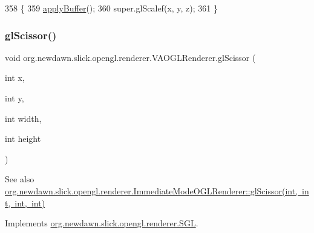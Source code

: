\begin{DoxyCode}
358                                                     \{
359         \mbox{\hyperlink{classorg_1_1newdawn_1_1slick_1_1opengl_1_1renderer_1_1_v_a_o_g_l_renderer_a7c5d09419cd40761be8f849631aebab5}{applyBuffer}}();
360         super.glScalef(x, y, z);
361     \}
\end{DoxyCode}
\mbox{\label{classorg_1_1newdawn_1_1slick_1_1opengl_1_1renderer_1_1_v_a_o_g_l_renderer_a496a073a0a3dea08b3fbace7673d6b29}} 
\subsubsection{\texorpdfstring{gl\+Scissor()}{glScissor()}}
{\footnotesize\ttfamily void org.\+newdawn.\+slick.\+opengl.\+renderer.\+V\+A\+O\+G\+L\+Renderer.\+gl\+Scissor (\begin{DoxyParamCaption}\item[{int}]{x,  }\item[{int}]{y,  }\item[{int}]{width,  }\item[{int}]{height }\end{DoxyParamCaption})\hspace{0.3cm}{\ttfamily [inline]}}

\begin{DoxySeeAlso}{See also}
\mbox{\hyperlink{classorg_1_1newdawn_1_1slick_1_1opengl_1_1renderer_1_1_immediate_mode_o_g_l_renderer_ad15ad5c6d86bfdabcb2b973506dd0cb3}{org.\+newdawn.\+slick.\+opengl.\+renderer.\+Immediate\+Mode\+O\+G\+L\+Renderer\+::gl\+Scissor(int, int, int, int)}} 
\end{DoxySeeAlso}


Implements \mbox{\hyperlink{interfaceorg_1_1newdawn_1_1slick_1_1opengl_1_1renderer_1_1_s_g_l_a59255fbfa67e6f0cd325f2bbe418d358}{org.\+newdawn.\+slick.\+opengl.\+renderer.\+S\+GL}}.


